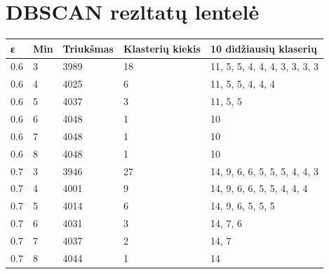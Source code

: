 \documentclass{VUMIFInfKursinis}
\begin{document}
\section{DBSCAN rezltatų lentelė}\label{dbscanTable}
\begin{table}[!ht]
\footnotesize
\begin{tabular}{|l|l|l|l|l|}
\hline
\textbf{ε} & \textbf{Min} & \textbf{Triukšmas} & \textbf{Klasterių kiekis} & \textbf{10 didžiausių klaserių}           \\ \hline
\rowcolor[HTML]{EFEFEF} 
0.6        & 3            & 3989               & 18                        & 11, 5, 5, 4, 4, 4, 3, 3, 3, 3             \\ \hline
\rowcolor[HTML]{EFEFEF} 
0.6        & 4            & 4025               & 6                         & 11, 5, 5, 4, 4, 4                         \\ \hline
\rowcolor[HTML]{EFEFEF} 
0.6        & 5            & 4037               & 3                         & 11, 5, 5                                  \\ \hline
\rowcolor[HTML]{EFEFEF} 
0.6        & 6            & 4048               & 1                         & 10                                        \\ \hline
\rowcolor[HTML]{EFEFEF} 
0.6        & 7            & 4048               & 1                         & 10                                        \\ \hline
\rowcolor[HTML]{EFEFEF} 
0.6        & 8            & 4048               & 1                         & 10                                        \\ \hline
0.7        & 3            & 3946               & 27                        & 14, 9, 6, 6, 5, 5, 5, 4, 4, 3             \\ \hline
0.7        & 4            & 4001               & 9                         & 14, 9, 6, 6, 5, 5, 4, 4, 4                \\ \hline
0.7        & 5            & 4014               & 6                         & 14, 9, 6, 5, 5, 5                         \\ \hline
0.7        & 6            & 4031               & 3                         & 14, 7, 6                                  \\ \hline
0.7        & 7            & 4037               & 2                         & 14, 7                                     \\ \hline
0.7        & 8            & 4044               & 1                         & 14                                        \\ \hline

\end{tabular}
\end{table}
\end{document}
